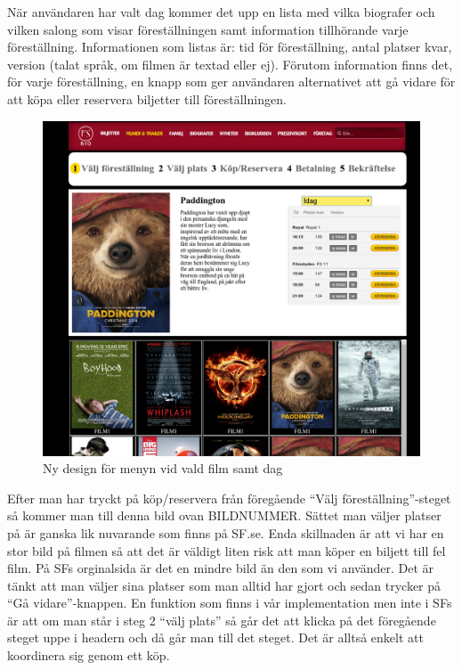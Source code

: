 \documentclass[swedish,a4paper,11pt]{article}
\begin{document}
\newpage
När användaren har valt dag kommer det upp en lista med vilka biografer och vilken salong som visar föreställningen samt information tillhörande varje föreställning. Informationen som listas är: tid för föreställning, antal platser kvar, version (talat språk, om filmen är textad eller ej). Förutom information finns det, för varje föreställning, en knapp som ger användaren alternativet att gå vidare för att köpa eller reservera biljetter till föreställningen.  

\begin{figure}[H]
\centering
\includegraphics[scale=0.27]{valddag.png} 
\caption{Ny design för menyn vid vald film samt dag}
\end{figure}



\newpage

Efter man har tryckt på köp/reservera från föregående “Välj föreställning”-steget så kommer man till denna bild ovan BILDNUMMER. Sättet man väljer platser på är ganska lik nuvarande som finns på SF.se. Enda skillnaden är att vi har en stor bild på filmen så att det är väldigt liten risk att man köper en biljett till fel film. På SFs orginalsida är det en mindre bild än den som vi använder. Det är tänkt att man väljer sina platser som man alltid har gjort och sedan trycker på “Gå vidare”-knappen. En funktion som finns i vår implementation men inte i SFs är att om man står i steg 2 “välj plats” så går det att klicka på det föregående steget uppe i headern och då går man till det steget. Det är alltså enkelt att koordinera sig genom ett köp.
\end{document}
